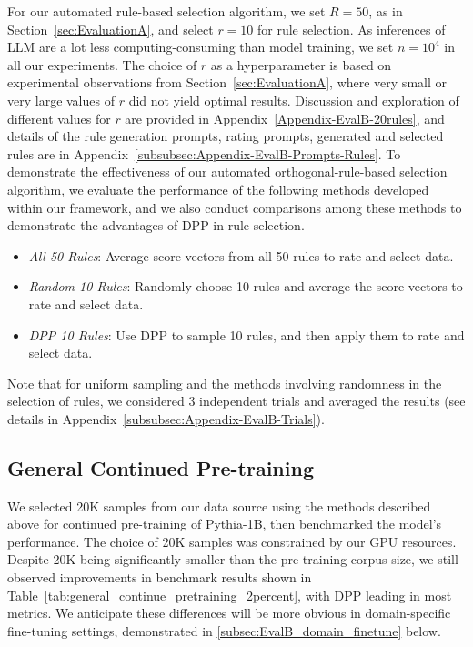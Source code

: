 \documentclass{article}
\begin{document}
For our automated rule-based selection algorithm, we set $R=50$, as in Section~\ref{sec:EvaluationA}, and select $r=10$ for rule selection. As inferences of LLM are a lot less computing-consuming than model training, we set $n=10^4$ in all our experiments. The choice of $r$ as a hyperparameter is based on experimental observations from Section~\ref{sec:EvaluationA}, where very small or very large values of $r$ did not yield optimal results. Discussion and exploration of different values for $r$ are provided in Appendix~\ref{Appendix-EvalB-20rules}, and details of the rule generation prompts, rating prompts, generated and selected rules are in Appendix~\ref{subsubsec:Appendix-EvalB-Prompts-Rules}. To demonstrate the effectiveness of our automated orthogonal-rule-based selection algorithm, we evaluate the performance of the following methods developed within our framework, and we also conduct comparisons among these methods to demonstrate the advantages of DPP in rule selection.
\begin{itemize}
    \setlength\itemsep{0em}
    \item \textit{All 50 Rules}: Average score vectors from all 50 rules to rate and select data.
    \item \textit{Random 10 Rules}: Randomly choose 10 rules and average the score vectors to rate and select data.
    \item \textit{DPP 10 Rules}: Use DPP to sample 10 rules, and then apply them to rate and select data.
\end{itemize}

Note that for uniform sampling and the methods involving randomness in the selection of rules, we considered 3 independent trials and averaged the results (see details in Appendix~\ref{subsubsec:Appendix-EvalB-Trials}).


\subsection{General Continued Pre-training}
We selected 20K samples from our data source using the methods described above for continued pre-training of Pythia-1B, then benchmarked the model’s performance. The choice of 20K samples was constrained by our GPU resources. Despite 20K being significantly smaller than the pre-training corpus size, we still observed improvements in benchmark results shown in Table~\ref{tab:general_continue_pretraining_2percent}, with DPP leading in most metrics. We anticipate these differences will be more obvious in domain-specific fine-tuning settings, demonstrated in \ref{subsec:EvalB_domain_finetune} below.
\end{document}
